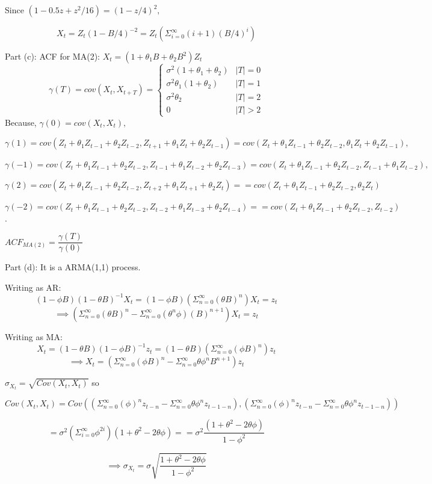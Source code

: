 \documentclass[12pt, oneside]{article}
\begin{document}
\begin{enumerate}
Since $(1-0.5z + z^2/16) = (1-z/4)^2,$

$$X_t = Z_t(1-B/4)^{-2} = Z_t (\Sigma_{i=0}^{\infty} (i+1) (B/4)^i)$$

Part (c): 
\newline ACF for MA(2): $X_t = (1 + \theta_1 B + \theta_2 B^2)Z_t$
$$
\gamma (T) = cov(X_t, X_{t+T}) = \begin{cases} 
      \sigma^2 (1 + \theta_1 + \theta_2) & |T| = 0 \\
      \sigma^2 \theta_1 (1 + \theta_2) & |T| = 1 \\
      \sigma^2 \theta_2 & |T| = 2 \\
      0 & |T| > 2
   \end{cases}
$$
Because, $\gamma(0) = cov(X_t, X_t),$ 

$\gamma(1) = cov(Z_t + \theta_1 Z_{t-1} + \theta_2 Z_{t-2}, Z_{t+1} + \theta_1 Z_{t} + \theta_2 Z_{t-1}) = cov(Z_t + \theta_1 Z_{t-1} + \theta_2 Z_{t-2}, \theta_1 Z_{t} + \theta_2 Z_{t-1}),$ 

$\gamma(-1) = cov(Z_t + \theta_1 Z_{t-1} + \theta_2 Z_{t-2}, Z_{t-1} + \theta_1 Z_{t-2} + \theta_2 Z_{t-3}) = cov(Z_t + \theta_1 Z_{t-1} + \theta_2 Z_{t-2}, Z_{t-1} + \theta_1 Z_{t-2}),$

$\gamma(2) = cov(Z_t + \theta_1 Z_{t-1} + \theta_2 Z_{t-2}, Z_{t+2} + \theta_1 Z_{t+1} + \theta_2 Z_{t}) = = cov(Z_t + \theta_1 Z_{t-1} + \theta_2 Z_{t-2}, \theta_2 Z_{t})$

$\gamma(-2) = cov(Z_t + \theta_1 Z_{t-1} + \theta_2 Z_{t-2}, Z_{t-2} + \theta_1 Z_{t-3} + \theta_2 Z_{t-4}) = = cov(Z_t + \theta_1 Z_{t-1} + \theta_2 Z_{t-2}, Z_{t-2})$.

$ACF_{MA(2)} = \dfrac{\gamma(T)}{\gamma(0)}$

Part (d): It is a ARMA(1,1) process.

Writing as AR: 
$$(1 - \phi B)(1 - \theta B)^{-1} X_t = (1 - \phi B)(\Sigma_{n=0}^{\infty} (\theta B)^n) X_t = z_t$$
$$\implies (\Sigma_{n=0}^{\infty} (\theta B)^n - \Sigma_{n=0}^{\infty} (\theta^n \phi )(B)^{n+1}) X_t = z_t
$$

Writing as MA:
$$X_t = (1 - \theta B)(1 - \phi B)^{-1} z_t = (1 - \theta B)(\Sigma_{n=0}^{\infty} (\phi B)^n) z_t$$
$$\implies X_t = (\Sigma_{n=0}^{\infty} (\phi B)^n - \Sigma_{n=0}^{\infty} \theta \phi^n B^{n+1}) z_t
$$

$\sigma_{X_t} = \sqrt{Cov(X_t,X_t)}$ so

$$
Cov(X_t,X_t) = Cov((\Sigma_{n=0}^{\infty} (\phi)^n z_{t-n} - \Sigma_{n=0}^{\infty} \theta \phi^n z_{t-1-n}), (\Sigma_{n=0}^{\infty} (\phi)^n z_{t-n} - \Sigma_{n=0}^{\infty} \theta \phi^n z_{t-1-n})) 
$$

$$= \sigma^2 (\Sigma_{i=0}^{\infty} \phi^{2i})(1 + \theta^2 -2\theta\phi) = = \sigma^2 \dfrac{(1 + \theta^2 -2\theta \phi)}{1 - \phi^2}$$

$$
\implies \sigma_{X_t} = \sigma \sqrt{\dfrac{1 + \theta^2 -2\theta \phi}{1 - \phi^2}}
$$
\end{enumerate} 
\end{document}
